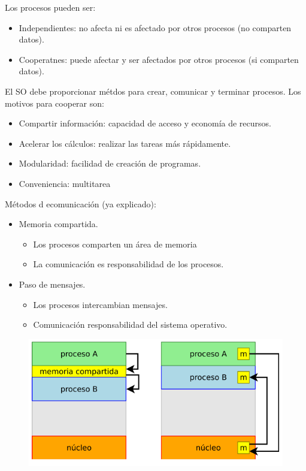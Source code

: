 \documentclass{article}
\begin{document}
Los procesos pueden ser:
\begin{itemize}
\item Independientes: no afecta ni es afectado por otros procesos (no comparten datos).

\item Cooperatnes: puede afectar y ser afectados por otros procesos (si comparten datos).
\end{itemize}

El SO debe proporcionar métdos para crear, comunicar y terminar procesos. Los motivos para cooperar son:
\begin{itemize}
\item Compartir información: capacidad de acceso y economía de recursos.

\item Acelerar los cálculos: realizar las tareas más rápidamente.

\item Modularidad: facilidad de creación de programas.

\item Conveniencia: multitarea
\end{itemize}

Métodos d ecomunicación (ya explicado):
\begin{itemize}
\item Memoria compartida.
	\begin{itemize}
	\item Los procesos comparten un área de memoria
	
	\item La comunicación es responsabilidad de los procesos.
	\end{itemize}

\item Paso de mensajes.
	\begin{itemize}
	\item Los procesos intercambian mensajes.
	
	\item Comunicación responsabilidad del sistema operativo.
	\end{itemize}
\end{itemize}

\begin{figure}[h]
\centering
\includegraphics[scale=1,width=\textwidth]{comunicacion.png}
\end{figure}
\end{document}
